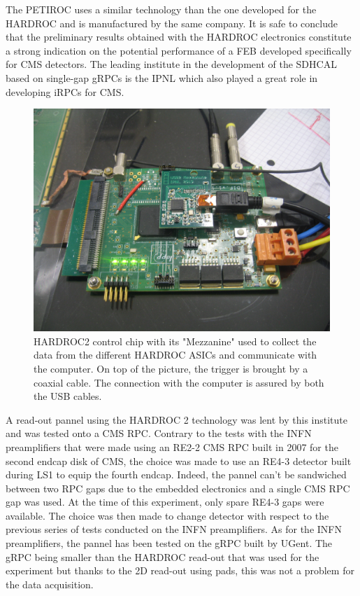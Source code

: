 	The PETIROC uses a similar technology than the one developed for the HARDROC and is manufactured by the same company. It is safe to conclude that the preliminary results obtained with the HARDROC electronics constitute a strong indication on the potential performance of a FEB developed specifically for CMS detectors. The leading institute in the development of the SDHCAL based on single-gap \acf{gRPCs} is the IPNL which also played a great role in developing iRPCs for CMS.
	
\begingroup\setlength{\intextsep}{5pt}\setlength{\columnsep}{15pt}

	\begin{figure}
	    \centering
		\includegraphics[width = \linewidth]{fig/chapt6/HARDROC_chip.JPG}
		\caption{\label{fig:HARDROC2-chip} HARDROC2 control chip with its "Mezzanine" used to collect the data from the different HARDROC ASICs and communicate with the computer. On top of the picture, the trigger is brought by a coaxial cable. The connection with the computer is assured by both the USB cables.}
    \end{figure}
	
	A read-out pannel using the HARDROC 2 technology was lent by this institute and was tested onto a CMS RPC. Contrary to the tests with the INFN preamplifiers that were made using an RE2-2 CMS RPC built in 2007 for the second endcap disk of CMS, the choice was made to use an RE4-3 detector built during LS1 to equip the fourth endcap. Indeed, the pannel can't be sandwiched between two RPC gaps due to the embedded electronics and a single CMS RPC gap was used. At the time of this experiment, only spare RE4-3 gaps were available. The choice was then made to change detector with respect to the previous series of tests conducted on the INFN preamplifiers. As for the INFN preamplifiers, the pannel has been tested on the gRPC built by UGent. The gRPC being smaller than the HARDROC read-out that was used for the experiment but thanks to the 2D read-out using pads, this was not a problem for the data acquisition.
	
